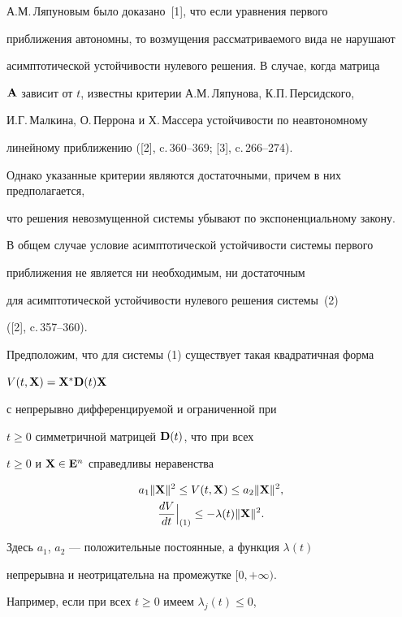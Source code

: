 А.М.\,Ляпуновым было доказано~[1], что если уравнения первого


приближения автономны, то возмущения рассматриваемого вида не нарушают


асимптотической устойчивости нулевого решения. В случае, когда матрица


$\bold A$ зависит от $t$, известны критерии А.М.\,Ляпунова, К.П.\,Персидского,


И.Г.\,Малкина, О.\,Перрона и Х.\,Массера устойчивости по неавтономному


линейному приближению ([2], c.\,360--369; [3], c.\,266--274).


Однако указанные критерии являются достаточными, причем в них предполагается,


что решения невозмущенной системы убывают по экспоненциальному закону.


В общем случае условие асимптотической устойчивости системы первого


приближения не является ни необходимым, ни достаточным


для асимптотической устойчивости нулевого решения системы~(2)


([2], c.\,357--360).


\smallskip





Предположим, что для системы (1) существует такая квадратичная форма


$V(t,\bold X)=\bold X^*\bold D(t)\bold X$


с непрерывно дифференцируемой и ограниченной при


$t\geq 0$ симметричной матрицей $\bold D(t)$, что при всех


$t\geq 0$ и $\bold X\in \bold E^n$ справедливы неравенства


\begin{gather}


a_1 \|\bold X\|^2 \leq V(t,\bold X) \leq a_2 \|\bold X\|^2, \\


\frac{dV}{dt} \Big|_{(1)} \leq -\lambda(t) \|\bold X\|^2.


\end{gather}


Здесь $a_1$, $a_2$ --- положительные постоянные, а функция $\lambda(t)$


непрерывна и неотрицательна на промежутке $[0, +\infty)$.


Например, если при всех $t\geq 0$ имеем $\lambda_j(t)\leq 0$,


